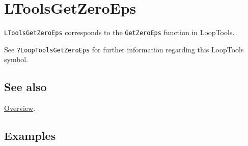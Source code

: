 \documentclass[../FeynHelpersManual.tex]{subfiles}
\begin{document}
\hypertarget{ltoolsgetzeroeps}{
\section{LToolsGetZeroEps}\label{ltoolsgetzeroeps}}

\texttt{LToolsGetZeroEps} corresponds to the \texttt{GetZeroEps}
function in LoopTools.

See \texttt{?LoopTools\textasciigrave GetZeroEps} for further
information regarding this LoopTools symbol.

\subsection{See also}

\hyperlink{toc}{Overview}.

\subsection{Examples}
\end{document}
